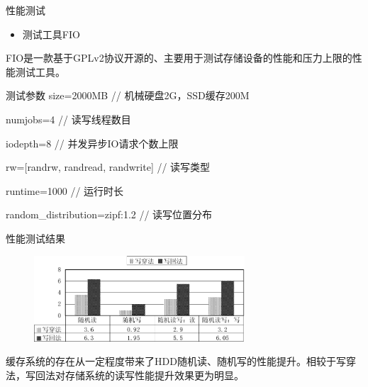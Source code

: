 \documentclass[compress]{beamer}
\begin{document}
\begin{frame}{性能测试}
\begin{itemize}
\item 测试工具FIO
\end{itemize}
FIO是一款基于GPLv2协议开源的、主要用于测试存储设备的性能和压力上限的性能测试工具。
\begin{block}{测试参数}
size=2000MB                // 机械硬盘2G，SSD缓存200M

numjobs=4                  // 读写线程数目

iodepth=8                  // 并发异步IO请求个数上限

rw=[randrw, randread, randwrite]  // 读写类型

runtime=1000                      // 运行时长

random\_distribution=zipf:1.2     // 读写位置分布
\end{block}
\end{frame}

\begin{frame}{性能测试结果}
\begin{figure}
\includegraphics[width=0.7\textwidth]{../graph/enhance-rate}
\end{figure}
缓存系统的存在从一定程度带来了HDD随机读、随机写的性能提升。相较于写穿法，写回法对存储系统的读写性能提升效果更为明显。
\end{frame}
\end{document}
